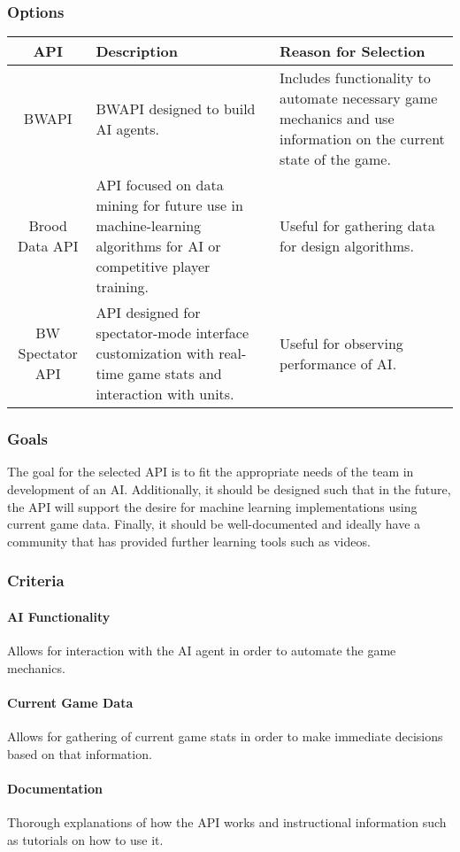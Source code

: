 \documentclass[10pt,letterpaper,onecolumn,draftclsnofoot]{IEEEtran}
\begin{document}
\subsubsection{Options}
\begin{center}
	\begin{tabular}{ ||C|L|L|| } 
		\hline
		API & Description & Reason for Selection \\
		\hline
		BWAPI & BWAPI designed to build AI agents. & Includes functionality to automate necessary game mechanics and use information on the current state of the game. \\ 
		\hline
		Brood Data API & API focused on data mining for future use in machine-learning algorithms for AI or competitive player training. & Useful for gathering data for design algorithms.\\ 
		\hline
		 BW Spectator API & API designed for spectator-mode interface customization with real-time game stats and interaction with units. & Useful for observing performance of AI. \\ 
		\hline
	\end{tabular}
\end{center}
\subsubsection{Goals}
	The goal for the selected API is to fit the appropriate needs of the team in development of an AI. Additionally, it should be designed such that in the future, the API will support the desire for machine learning implementations using current game data. Finally, it should be well-documented and ideally have a community that has provided further learning tools such as videos.
\subsubsection{Criteria}
	\paragraph{AI Functionality}
	Allows for interaction with the AI agent in order to automate the game mechanics.
	\paragraph{Current Game Data}
	Allows for gathering of current game stats in order to make immediate decisions based on that information.
	\paragraph{Documentation}
	Thorough explanations of how the API works and instructional information such as tutorials on how to use it.
\end{document}
